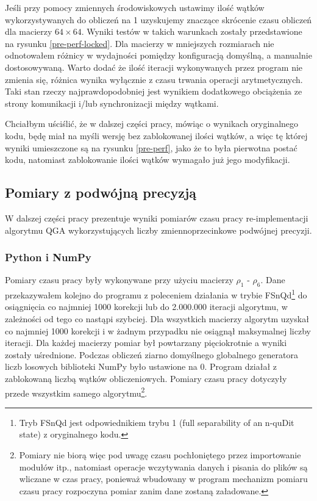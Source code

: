 \documentclass[11pt, a4paper]{article}
\begin{document}
\begin{sloppypar}
    Jeśli przy pomocy zmiennych środowiskowych ustawimy ilość wątków wykorzystywanych do
    obliczeń na 1 uzyskujemy znaczące skrócenie czasu obliczeń dla macierzy $64\times64$.
    Wyniki testów w takich warunkach zostały przedstawione na rysunku
    \ref{pre-perf-locked}. Dla macierzy w mniejszych rozmiarach nie odnotowałem różnicy w
    wydajności pomiędzy konfiguracją domyślną, a manualnie dostosowywaną. Warto dodać że
    ilość iteracji wykonywanych przez program nie zmienia się, różnica wynika wyłącznie
    z czasu trwania operacji arytmetycznych. Taki stan rzeczy najprawdopodobniej jest wynikiem
    dodatkowego obciążenia ze strony komunikacji i/lub synchronizacji między wątkami.

    Chciałbym uściślić, że w dalszej części pracy, mówiąc o wynikach oryginalnego kodu,
    będę miał na myśli wersję bez zablokowanej ilości wątków, a więc tę której wyniki umieszczone
    są na rysunku \ref{pre-perf}, jako że to była pierwotna postać kodu, natomiast zablokowanie
    ilości wątków wymagało już jego modyfikacji.

    \subsection{Pomiary z podwójną precyzją}
    W dalszej części pracy prezentuje wyniki pomiarów czasu pracy re-implementacji algorytmu
    QGA wykorzystujących liczby zmiennoprzecinkowe podwójnej precyzji.

    \subsubsection{ Python i NumPy }
    Pomiary czasu pracy były wykonywane przy użyciu macierzy $\rho_{1}$ - $\rho_{6}$.
    Dane przekazywałem kolejno do programu z poleceniem działania w trybie FSnQd\footnote{Tryb
    FSnQd jest odpowiednikiem trybu 1 (full separability of an n-quDit state) z oryginalnego
    kodu.} do osiągnięcia co najmniej 1000 korekcji lub do 2.000.000 iteracji algorytmu,
    w zależności od tego co nastąpi szybciej. Dla wszystkich macierzy algorytm uzyskał
    co najmniej 1000 korekcji i w żadnym przypadku nie osiągnął maksymalnej liczby
    iteracji. Dla każdej macierzy pomiar był powtarzany pięciokrotnie a wyniki zostały uśrednione.
    Podczas obliczeń ziarno domyślnego globalnego generatora liczb losowych biblioteki
    NumPy było ustawione na 0. Program działał z zablokowaną liczbą wątków
    obliczeniowych. Pomiary czasu pracy dotyczyły przede wszystkim samego algorytmu\footnote{Pomiary
    nie biorą więc pod uwagę czasu pochłoniętego przez importowanie modułów itp.,
    natomiast operacje wczytywania danych i pisania do plików są wliczane w czas pracy, ponieważ
    wbudowany w program mechanizm pomiaru czasu pracy rozpoczyna pomiar zanim dane zostaną
    załadowane.}.


\end{sloppypar}
\end{document}
